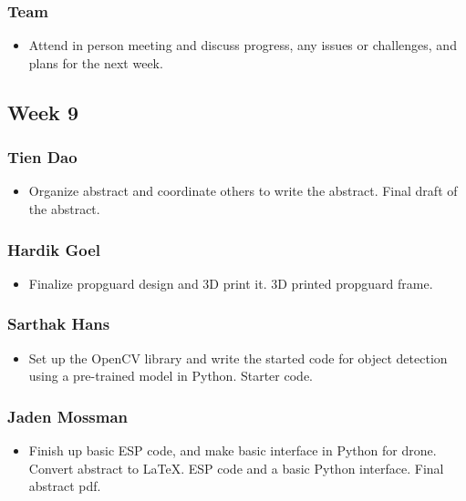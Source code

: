 \documentclass[12pt]{article}
\begin{document}
            \subsubsection*{Team}
                \begin{itemize}
                    \item Attend in person meeting and discuss progress, any issues or challenges, and plans for the next week.
                \end{itemize}
        
        \subsection*{Week 9}
            \subsubsection*{Tien Dao}
                \begin{itemize}
                    \item Organize abstract and coordinate others to write the abstract. Final draft of the abstract.
                \end{itemize}
            \subsubsection*{Hardik Goel}
                \begin{itemize}
                    \item Finalize propguard design and 3D print it. 3D printed propguard frame.
                \end{itemize}
            \subsubsection*{Sarthak Hans}
                \begin{itemize}
                    \item Set up the OpenCV library and write the started code for object detection using a pre-trained model in Python. Starter code.
                \end{itemize}
            \subsubsection*{Jaden Mossman}
                \begin{itemize}
                    \item Finish up basic ESP code, and make basic interface in Python for drone. Convert abstract to LaTeX. ESP code and a basic Python interface. Final abstract pdf.
                \end{itemize}
\end{document}
